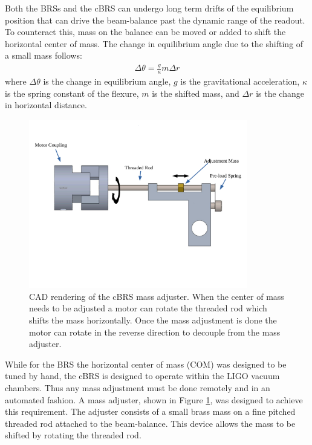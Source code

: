 \documentclass [12pt, proquest]{uwthesis}[2019]
\begin{document}
Both the BRSs and the cBRS can undergo long term drifts of the equilibrium position that can drive the beam-balance past the dynamic range of the readout. To counteract this, mass on the balance can be moved or added to shift the horizontal center of mass. The change in equilibrium angle due to the shifting of a small mass follows:
\begin{align}
\Delta \theta=\frac{g}{\kappa} m \Delta r
\end{align}
where $\Delta \theta$ is the change in equilibrium angle, $g$ is the gravitational acceleration, $\kappa$ is the spring constant of the flexure, $m$ is the shifted mass, and $\Delta r$ is the change in horizontal distance.


\begin{figure}[!h]
\begin{center}
\includegraphics[width=0.85\textwidth]{cBRSMassAdjusterLabeled.pdf}
\end{center}
\caption[CAD rendering of the cBRS mass adjuster]{CAD rendering of the cBRS mass adjuster. When the center of mass needs to be adjusted a motor can rotate the threaded rod which shifts the mass horizontally. Once the mass adjustment is done the motor can rotate in the reverse direction to decouple from the mass adjuster.}\label{massAdjust}
\end{figure}


While for the BRS the horizontal center of mass (COM) was designed to be tuned by hand, the cBRS is designed to operate within the LIGO vacuum chambers. Thus any mass adjustment must be done remotely and in an automated fashion. A mass adjuster, shown in Figure \ref{massAdjust}, was designed to achieve this requirement. The adjuster consists of a small brass mass on a fine pitched threaded rod attached to the beam-balance. This device allows the mass to be shifted by rotating the threaded rod.
\end{document}
